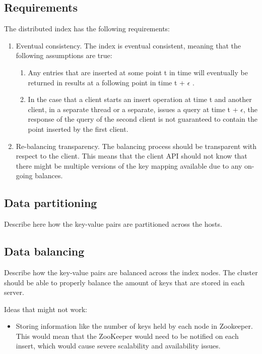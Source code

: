\documentclass[11pt,a4paper]{globis-book}
\begin{document}
\subsection{Requirements}
The distributed index has the following requirements:
\begin{enumerate}
    \item Eventual consistency. The index is eventual consistent, meaning that the following assumptions are true:
        \begin{enumerate}
            \item Any entries that are inserted at some point t in time will eventually be returned in results at a following point in time t + $\epsilon$ .
            \item In the case that a client starts an insert operation at time t and another client, in a separate thread or a separate, issues a query at time t + $\epsilon$, the response of the query of the second client is not guaranteed to contain the point inserted by the first client.
        \end{enumerate} 
    \item Re-balancing transparency. The balancing process should be transparent with respect to the client. This means that the client API should not know that there might be multiple versions of the key mapping available due to any on-going balances. 
\end{enumerate} 

\subsection{Data partitioning}

Describe here how the key-value pairs are partitioned across the hosts.

\subsection{Data balancing}

Describe how the key-value pairs are balanced across the index nodes.
The cluster should be able to properly balance the amount of keys that are stored in each server.

Ideas that might not work:
\begin{itemize}
    \item Storing information like the number of keys held by each node in Zookeeper. This would mean that the ZooKeeper would need to be notified on each insert, which would cause severe scalability and availability issues. 
\end{itemize}
\end{document}
